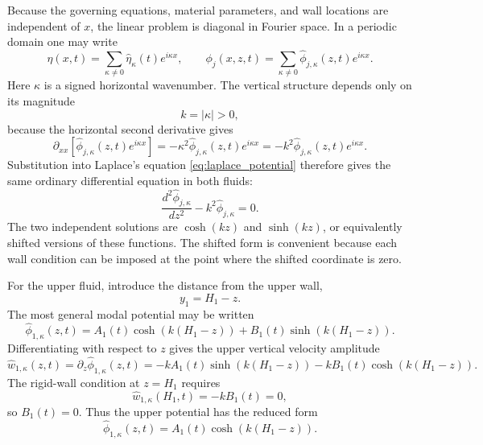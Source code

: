 \documentclass[11pt,a4paper]{article}
\begin{document}
Because the governing equations, material parameters, and wall locations are independent of $x$, the linear problem is diagonal in Fourier space.  In a periodic domain one may write
\begin{equation}
    \eta(x,t)
    =
    \sum_{\kappa\neq 0}
    \widehat{\eta}_{\kappa}(t)e^{i\kappa x},
    \qquad
    \phi_j(x,z,t)
    =
    \sum_{\kappa\neq 0}
    \widehat{\phi}_{j,\kappa}(z,t)e^{i\kappa x}.
    \label{eq:background_fourier_expansion}
\end{equation}
Here $\kappa$ is a signed horizontal wavenumber.  The vertical structure depends only on its magnitude
\begin{equation}
    k=|\kappa|>0,
\end{equation}
because the horizontal second derivative gives
\begin{equation}
    \partial_{xx}
    \left[
    \widehat{\phi}_{j,\kappa}(z,t)e^{i\kappa x}
    \right]
    =
    -\kappa^2
    \widehat{\phi}_{j,\kappa}(z,t)e^{i\kappa x}
    =
    -k^2
    \widehat{\phi}_{j,\kappa}(z,t)e^{i\kappa x}.
\end{equation}
Substitution into Laplace's equation \eqref{eq:laplace_potential} therefore gives the same ordinary differential equation in both fluids:
\begin{equation}
    \frac{d^2\widehat{\phi}_{j,\kappa}}{dz^2}
    -
    k^2\widehat{\phi}_{j,\kappa}
    =
    0.
    \label{eq:vertical_potential_ode}
\end{equation}
The two independent solutions are $\cosh(kz)$ and $\sinh(kz)$, or equivalently shifted versions of these functions.  The shifted form is convenient because each wall condition can be imposed at the point where the shifted coordinate is zero.

For the upper fluid, introduce the distance from the upper wall,
\begin{equation}
    y_1=H_1-z.
\end{equation}
The most general modal potential may be written
\begin{equation}
    \widehat{\phi}_{1,\kappa}(z,t)
    =
    A_1(t)\cosh(k(H_1-z))
    +
    B_1(t)\sinh(k(H_1-z)).
    \label{eq:upper_general_potential}
\end{equation}
Differentiating with respect to $z$ gives the upper vertical velocity amplitude
\begin{equation}
    \widehat{w}_{1,\kappa}(z,t)
    =
    \partial_z\widehat{\phi}_{1,\kappa}(z,t)
    =
    -kA_1(t)\sinh(k(H_1-z))
    -
    kB_1(t)\cosh(k(H_1-z)).
\end{equation}
The rigid-wall condition at $z=H_1$ requires
\begin{equation}
    \widehat{w}_{1,\kappa}(H_1,t)
    =
    -kB_1(t)
    =
    0,
\end{equation}
so $B_1(t)=0$.  Thus the upper potential has the reduced form
\begin{equation}
    \widehat{\phi}_{1,\kappa}(z,t)
    =
    A_1(t)\cosh(k(H_1-z)).
\end{equation}
\end{document}
